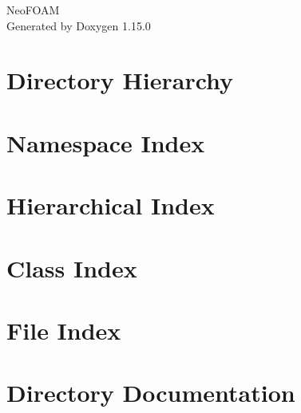 \documentclass[twoside]{book}
\newcommand{\+}{\discretionary{\mbox{\scriptsize$\hookleftarrow$}}{}{}}
\newcommand{\clearemptydoublepage}{%
    \newpage{\pagestyle{empty}\cleardoublepage}%
  }
\begin{document}
  \raggedbottom
    \hypersetup{pageanchor=false,
                bookmarksnumbered=true,
                pdfencoding=unicode
               }
  \begin{titlepage}
  \vspace*{7cm}
  \begin{center}%
  {\Large Neo\+FOAM}\\
  \vspace*{1cm}
  {\large Generated by Doxygen 1.15.0}\\
  \end{center}
  \end{titlepage}
  \clearemptydoublepage
  \tableofcontents
  \clearemptydoublepage
  \hypersetup{pageanchor=true}
\chapter{Directory Hierarchy}

\chapter{Namespace Index}

\chapter{Hierarchical Index}

\chapter{Class Index}

\chapter{File Index}

\chapter{Directory Documentation}













\end{document}
